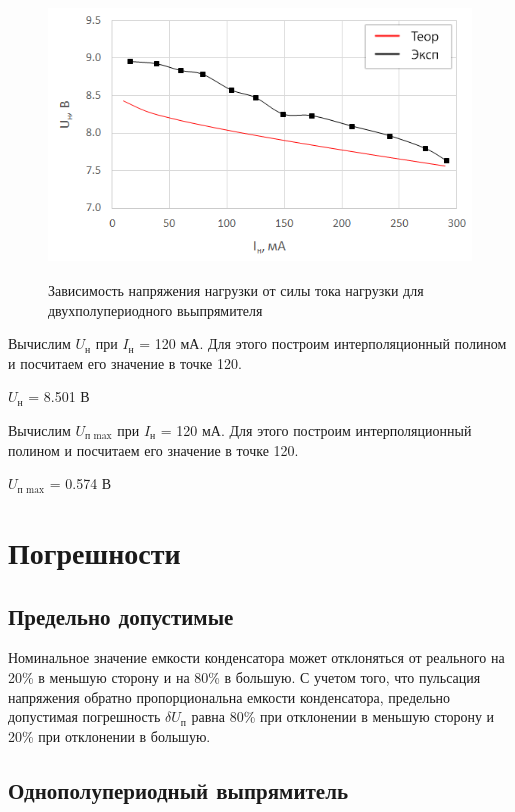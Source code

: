 \begin{figure}[H]
	\begin{center}
		\includegraphics[height=7.5cm]{img/5}
		\caption{Зависимость напряжения нагрузки от силы тока нагрузки для двухполупериодного вьыпрямителя}
		\label{g:5} %
	\end{center}
\end{figure}

Вычислим $U_\text{н}$ при $I_\text{н}$ = 120 мА. Для этого построим интерполяционный полином и посчитаем его значение в точке 120.

$U_\text{н}$ = 8.501 В

Вычислим $U_\text{п max}$ при $I_\text{н}$ = 120 мА. Для этого построим интерполяционный полином и посчитаем его значение в точке 120.

$U_\text{п max}$ = 0.574 В

\section{Погрешности}

\subsection{Предельно допустимые}

Номинальное значение емкости конденсатора может отклоняться от реального на 20\% в меньшую сторону и на 80\% в большую. С учетом того, что пульсация напряжения обратно пропорциональна емкости конденсатора, предельно допустимая погрешность $\delta U_\text{п}$ равна 80\% при отклонении в меньшую сторону и 20\% при отклонении в большую.

\subsection{Однополупериодный выпрямитель}

